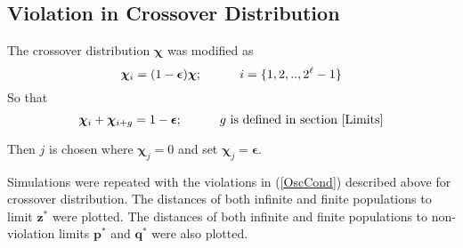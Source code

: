 % 
% 

\subsection{Violation in Crossover Distribution}
The crossover distribution $\bm{\chi}$ was modified as
\[
\bm{\chi}_i = (1-\bm{\epsilon}) \bm{\chi} ; \hspace{30pt} i = \{1, 2,.., 2^{\ell}-1\} 
\]
So that 
\[
\bm{\chi}_i + \bm{\chi}_{i+g} = 1-\bm{\epsilon} ; \hspace{30pt} g \text{ is defined in  section } \ref{Limits}
\]

Then $j$ is chosen where $\bm{\chi}_j = 0$ and set $\bm{\chi}_j = \bm{\epsilon}$. 

Simulations were repeated with the violations in (\ref{OscCond}) described above for crossover distribution.
The distances of both infinite and finite populations to limit $\bm{z}^\ast$ were plotted. 
The distances of both infinite and finite populations to non-violation limits $\bm{p}^\ast$ and $\bm{q}^\ast$ were also plotted.

